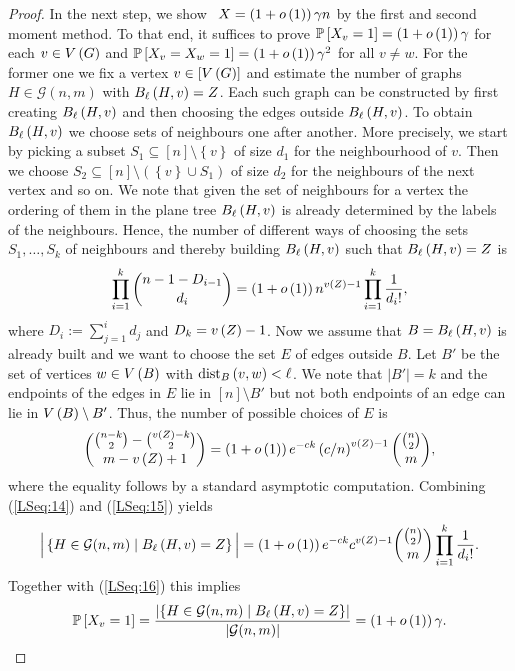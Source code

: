 \begin{proof}
In the next step, we show \whp\ $X=\left(1+o\left(1\right)\right)\gamma n$ by the first and second moment method. To that end, it suffices to prove $\mathbb{P}\left[X_v=1\right]=\left(1+o\left(1\right)\right)\gamma$ for each $v\in V\left(G\right)$ and $\mathbb{P}\left[X_v=X_w=1\right]=\left(1+o\left(1\right)\right)\gamma^2$ for all $v\neq w$. For the former one we fix a vertex $v\in[V\left(G\right)]$ and estimate the number of graphs $H\in \mathcal{G}(n,m)$ with $B_{\ell}\left(H, v\right)=Z$. Each such graph can be constructed by first creating $B_{\ell}\left(H, v\right)$ and then choosing the edges outside $B_{\ell}\left(H, v\right)$. To obtain $B_{\ell}\left(H, v\right)$ we choose sets of neighbours one after another. More precisely, we start by picking a subset $S_1\subseteq[n]\setminus\left\{v\right\}$ of size $d_1$ for the neighbourhood of $v$. Then we choose $S_2\subseteq[n]\setminus\left(\left\{v\right\}\cup S_1\right)$ of size $d_2$ for the neighbours of the next vertex and so on. We note that given the set of neighbours for a vertex the ordering of them in the plane tree $B_{\ell}\left(H, v\right)$ is already determined by the labels of the neighbours. Hence, the number of different ways of choosing the sets $S_1, \ldots, S_k$ of neighbours and thereby building $B_{\ell}\left(H, v\right)$ such that $B_{\ell}\left(H, v\right)=Z$ is
\begin{align}\label{LSeq:14}
\prod_{i=1}^{k} \binom{n-1-D_{i-1}}{d_i}=\left(1+o\left(1\right)\right)n^{v\left({Z}\right)-1}\prod_{i=1}^{k}\frac{1}{d_i!},
\end{align}
where $D_i:=\sum_{j=1}^{i}d_{j}$ and $D_k=v\left({Z}\right)-1$. Now we assume that $B=B_{\ell}\left(H, v\right)$ is already built and we want to choose the set $E$ of edges outside $B$. Let $B'$ be the set of vertices $w\in V\left(B\right)$ with $\operatorname{dist}_{B}\left(v, w\right)<\ell$. We note that $|B'|=k$ and the endpoints of the edges in $E$ lie in $[n]\setminus B'$ but not both endpoints of an edge can lie in $V\left(B\right)\setminus B'$.  
Thus, the number of possible choices of $E$ is
\begin{align}\label{LSeq:15}
\binom{\binom{n-k}{2}-\binom{v\left({Z}\right)-k}{2}}{m-v\left({Z}\right)+1}=\left(1+o\left(1\right)\right)e^{-ck}\left(c/n\right)^{v\left({Z}\right)-1}\binom{\binom{n}{2}}{m},
\end{align}
where the equality follows by a standard asymptotic computation. Combining (\ref{LSeq:14}) and (\ref{LSeq:15}) yields
\begin{align}
\Big|\left\{H\in\mathcal{G}(n,m) \mid B_{\ell}\left(H, v\right)=Z\right\}\Big|=\left(1+o\left(1\right)\right)e^{-ck}c^{v\left({Z}\right)-1}\binom{\binom{n}{2}}{m}\prod_{i=1}^{k}\frac{1}{d_i!}.
\end{align}
Together with (\ref{LSeq:16}) this implies
\begin{align}\label{LSeq:17}
\mathbb{P}\left[X_v=1\right]=\frac{\left|\left\{H\in\mathcal{G}(n,m) \mid B_{\ell}\left(H, v\right)=Z\right\}\right|}{\left|\mathcal{G}(n,m)\right|}=\left(1+o\left(1\right)\right)\gamma.
\end{align}


\end{proof}
